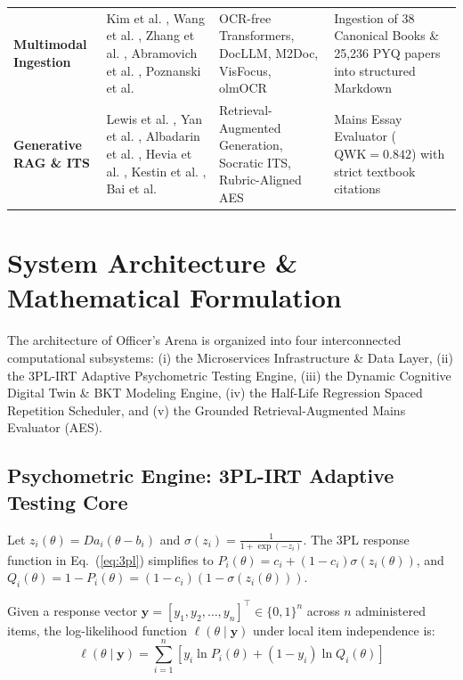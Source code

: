 \documentclass[conference]{IEEEtran}
\begin{document}
\begin{table}[t]
\begin{tabularx}{\textwidth}{lp{3.8cm}p{3.8cm}p{4.8cm}}
\textbf{Multimodal Ingestion} & Kim et al. \cite{Kim2022}, Wang et al. \cite{Wang2024}, Zhang et al. \cite{Zhang2024}, Abramovich et al. \cite{Abramovich2024}, Poznanski et al. \cite{Poznanski2025} & OCR-free Transformers, DocLLM, M2Doc, VisFocus, olmOCR & Ingestion of 38 Canonical Books \& 25,236 PYQ papers into structured Markdown \\
\textbf{Generative RAG \& ITS} & Lewis et al. \cite{Lewis2020}, Yan et al. \cite{Yan2024}, Albadarin et al. \cite{Albadarin2024}, Hevia et al. \cite{Hevia2025}, Kestin et al. \cite{Kestin2025}, Bai et al. \cite{Bai2025} & Retrieval-Augmented Generation, Socratic ITS, Rubric-Aligned AES & Mains Essay Evaluator ($\text{QWK} = 0.842$) with strict textbook citations \\
\bottomrule
\end{tabularx}
\end{table}

\section{System Architecture \& Mathematical Formulation}
The architecture of Officer's Arena is organized into four interconnected computational subsystems: (i) the Microservices Infrastructure \& Data Layer, (ii) the 3PL-IRT Adaptive Psychometric Testing Engine, (iii) the Dynamic Cognitive Digital Twin \& BKT Modeling Engine, (iv) the Half-Life Regression Spaced Repetition Scheduler, and (v) the Grounded Retrieval-Augmented Mains Evaluator (AES).

\subsection{Psychometric Engine: 3PL-IRT Adaptive Testing Core}
Let $z_i(\theta) = D a_i (\theta - b_i)$ and $\sigma(z_i) = \frac{1}{1 + \exp(-z_i)}$. The 3PL response function in Eq.~(\ref{eq:3pl}) simplifies to $P_i(\theta) = c_i + (1 - c_i) \sigma(z_i(\theta))$, and $Q_i(\theta) = 1 - P_i(\theta) = (1 - c_i)(1 - \sigma(z_i(\theta)))$.

Given a response vector $\mathbf{y} = [y_1, y_2, \dots, y_n]^\top \in \{0, 1\}^n$ across $n$ administered items, the log-likelihood function $\ell(\theta \mid \mathbf{y})$ under local item independence is:
\begin{equation}
    \ell(\theta \mid \mathbf{y}) = \sum_{i=1}^n \left[ y_i \ln P_i(\theta) + (1 - y_i) \ln Q_i(\theta) \right]
    \label{eq:log_likelihood}
\end{equation}
\end{document}
